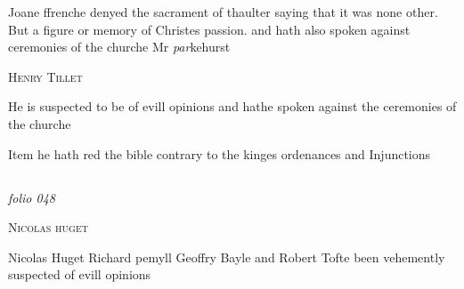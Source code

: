 \documentclass[12pt, a4paper]{book}
\begin{document}
               	
				\marginpar[\vspace{0.5cm}{\textcolor{Gray}{n}}]{}
			
               		
				\marginpar[\vspace{0.5cm}{\textcolor{Gray}{herecie}}]{}
			
               		
		\ifthenelse{\isodd{\thepage}}
		{\reversemarginpar}
		{\normalmarginpar}
		Joane ffrenche denyed the sacrament of thaulter
 saying that it was none other. But a figure
 or memory of Christes passion. and hath also
 spoken against ceremonies of the churche Mr \textit{par}kehurst
 

               
                  
				\begin{center}  {\scshape Henry Tillet}  \end{center}
			

		\ifthenelse{\isodd{\thepage}}
		{\reversemarginpar}
		{\normalmarginpar}
		He is suspected to be of evill opinions and hathe
 spoken against the ceremonies of the churche
 
		\ifthenelse{\isodd{\thepage}}
		{\reversemarginpar}
		{\normalmarginpar}
		Item he hath red the bible contrary to the kinges
 ordenances and Injunctions


               

\dotfill
						\newpage {} \subsection*{}  \subsection*{}

\textit{folio 048}


               
                  
				\begin{center}  {\scshape Nicolas huget}  \end{center}
			
               	
		\ifthenelse{\isodd{\thepage}}
		{\reversemarginpar}
		{\normalmarginpar}
		Nicolas Huget Richard pemyll Geoffry Bayle
               		and Robert Tofte been vehemently suspected of
 evill opinions
 

            
            
\end{document}
